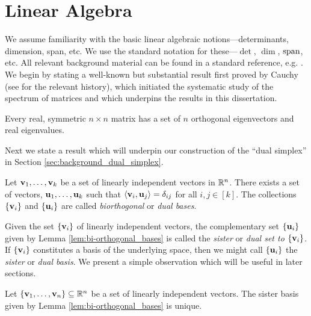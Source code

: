 \section{Linear Algebra}
\label{sec:background_linear} 
We assume familiarity with the basic linear algebraic notions---determinants, dimension, span, etc. We use the standard notation for these---$\det$, $\dim$, $\textnormal{span}$, etc. All relevant background material can be found in a standard reference, e.g. \cite{axler1997linear}. 
We begin by stating a well-known but substantial result first proved by Cauchy (see \cite{hawkins1975cauchy} for the relevant history), which initiated the systematic study of the spectrum of matrices and which underpins the results in this dissertation. 

\begin{theorem}
	\label{thm:spectral_theorem}
	Every real, symmetric $n\times n$ matrix has a set of $n$ orthogonal eigenvectors and real eigenvalues.  
\end{theorem}

Next we state a result which will underpin our construction of the ``dual simplex'' in Section \ref{sec:background_dual_simplex}. 

\begin{lemma}
\label{lem:bi-orthogonal_bases}
Let $\vb{v}_1,\dots,\vb{v}_k$ be a set of linearly independent vectors in $\mathbb{R}^n$. There exists a set of vectors, $\vb{u}_1,\dots,\vb{u}_k$ such that $\langle \vb{v}_i,\vb{u}_j\rangle = \delta_{ij}$ for all $i,j\in[k]$. The collections $\{\vb{v}_i\}$ and $\{\vb{u}_i\}$ are called \emph{biorthogonal} or \emph{dual bases}.  
\end{lemma}

Given the set $\{\vb{v}_i\}$ of linearly independent vectors, the complementary set $\{\vb{u}_i\}$ given by Lemma \ref{lem:bi-orthogonal_bases} is called the \emph{sister} or \emph{dual set to $\{\vb{v}_i\}$}. If $\{\vb{v}_i\}$ constitutes a basis of the underlying space, then we might call $\{\vb{u}_i\}$ the \emph{sister} or \emph{dual basis}.  We present a simple observation which will be useful in later sections. 

\begin{observation}
\label{obs:bi-orthogonal_unique}
Let $\{\vb{v}_1,\dots,\vb{v}_n\}\subseteq\mathbb{R}^n$ be a set of linearly independent vectors. The sister basis given by Lemma \ref{lem:bi-orthogonal_bases} is unique. 
\end{observation}

